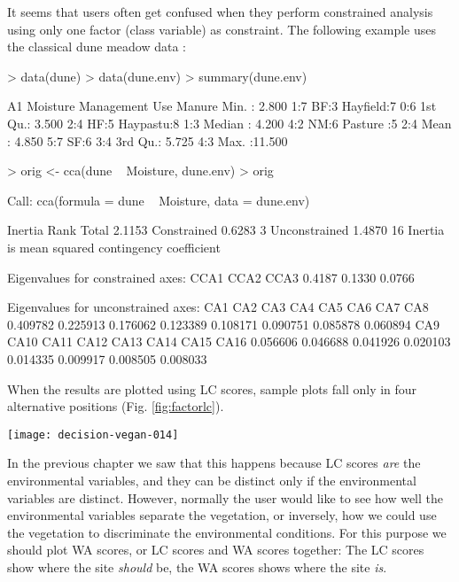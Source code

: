 \documentclass[a4paper,10pt]{amsart}
\begin{document}
It seems that users often get confused when they perform constrained
analysis using  only one factor (class variable) as constraint.  The
following example uses the classical dune meadow data \cite{Jongman87}:
\begin{Schunk}
\begin{Sinput}
> data(dune)
> data(dune.env)
> summary(dune.env)
\end{Sinput}
\begin{Soutput}
       A1         Moisture Management       Use    Manure
 Min.   : 2.800   1:7      BF:3       Hayfield:7   0:6   
 1st Qu.: 3.500   2:4      HF:5       Haypastu:8   1:3   
 Median : 4.200   4:2      NM:6       Pasture :5   2:4   
 Mean   : 4.850   5:7      SF:6                    3:4   
 3rd Qu.: 5.725                                    4:3   
 Max.   :11.500                                          
\end{Soutput}
\begin{Sinput}
> orig <- cca(dune ~ Moisture, dune.env)
> orig
\end{Sinput}
\begin{Soutput}
Call:
cca(formula = dune ~ Moisture, data = dune.env) 

              Inertia Rank
Total          2.1153     
Constrained    0.6283    3
Unconstrained  1.4870   16
Inertia is mean squared contingency coefficient 

Eigenvalues for constrained axes:
  CCA1   CCA2   CCA3 
0.4187 0.1330 0.0766 

Eigenvalues for unconstrained axes:
     CA1      CA2      CA3      CA4      CA5      CA6      CA7      CA8 
0.409782 0.225913 0.176062 0.123389 0.108171 0.090751 0.085878 0.060894 
     CA9     CA10     CA11     CA12     CA13     CA14     CA15     CA16 
0.056606 0.046688 0.041926 0.020103 0.014335 0.009917 0.008505 0.008033 
\end{Soutput}
\end{Schunk}
When the results are plotted using LC scores, sample plots fall only
in four alternative positions (Fig. \ref{fig:factorlc}).
\begin{SCfigure}
\texttt{[image: decision-vegan-014]}
\caption{LC scores of the dune meadow data using only one factor as a
  constraint.}
\label{fig:factorlc}
\end{SCfigure}
In the previous chapter we saw that this happens because LC scores
\emph{are} the environmental variables, and they can be distinct only
if the environmental variables are distinct.  However, normally the user
would like to see how well the environmental variables separate the
vegetation, or inversely, how we could use the vegetation to
discriminate the environmental conditions.  For this purpose we should
plot WA scores, or LC scores and WA scores together:  The LC scores
show where the site \emph{should} be, the WA scores shows where the
site \emph{is}.
\end{document}
